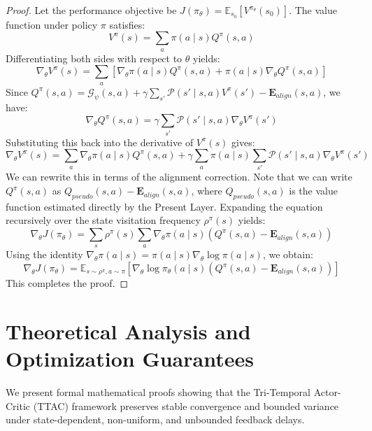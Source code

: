 \documentclass[manuscript, screen, review]{jair}
\begin{document}
\begin{proof}
Let the performance objective be $J(\pi_\theta) = \mathbb{E}_{s_0} [V^{\pi_\theta}(s_0)]$. The value function under policy $\pi$ satisfies:
\begin{equation*}
    V^\pi(s) = \sum_a \pi(a \mid s) Q^\pi(s, a)
\end{equation*}
Differentiating both sides with respect to $\theta$ yields:
\begin{equation*}
    \nabla_\theta V^\pi(s) = \sum_a \left[ \nabla_\theta \pi(a \mid s) Q^\pi(s, a) + \pi(a \mid s) \nabla_\theta Q^\pi(s, a) \right]
\end{equation*}
Since $Q^\pi(s, a) = \mathcal{G}_\psi(s, a) + \gamma \sum_{s'} \mathcal{P}(s' \mid s, a) V^\pi(s') - \mathbf{E}_{align}(s, a)$, we have:
\begin{equation*}
    \nabla_\theta Q^\pi(s, a) = \gamma \sum_{s'} \mathcal{P}(s' \mid s, a) \nabla_\theta V^\pi(s')
\end{equation*}
Substituting this back into the derivative of $V^\pi(s)$ gives:
\begin{equation*}
    \nabla_\theta V^\pi(s) = \sum_a \nabla_\theta \pi(a \mid s) Q^\pi(s, a) + \gamma \sum_a \pi(a \mid s) \sum_{s'} \mathcal{P}(s' \mid s, a) \nabla_\theta V^\pi(s')
\end{equation*}
We can rewrite this in terms of the alignment correction. Note that we can write $Q^\pi(s, a)$ as $Q_{pseudo}(s, a) - \mathbf{E}_{align}(s, a)$, where $Q_{pseudo}(s, a)$ is the value function estimated directly by the Present Layer. Expanding the equation recursively over the state visitation frequency $\rho^\pi(s)$ yields:
\begin{equation*}
    \nabla_\theta J(\pi_\theta) = \sum_s \rho^\pi(s) \sum_a \nabla_\theta \pi(a \mid s) \left( Q^\pi(s, a) - \mathbf{E}_{align}(s, a) \right)
\end{equation*}
Using the identity $\nabla_\theta \pi(a \mid s) = \pi(a \mid s) \nabla_\theta \log \pi(a \mid s)$, we obtain:
\begin{equation*}
    \nabla_\theta J(\pi_\theta) = \mathbb{E}_{s \sim \rho^\pi, a \sim \pi} \left[ \nabla_\theta \log \pi_\theta(a \mid s) \left( Q^\pi(s, a) - \mathbf{E}_{align}(s, a) \right) \right]
\end{equation*}
This completes the proof.
\end{proof}

\section{Theoretical Analysis and Optimization Guarantees}
We present formal mathematical proofs showing that the Tri-Temporal Actor-Critic (TTAC) framework preserves stable convergence and bounded variance under state-dependent, non-uniform, and unbounded feedback delays.
\end{document}
